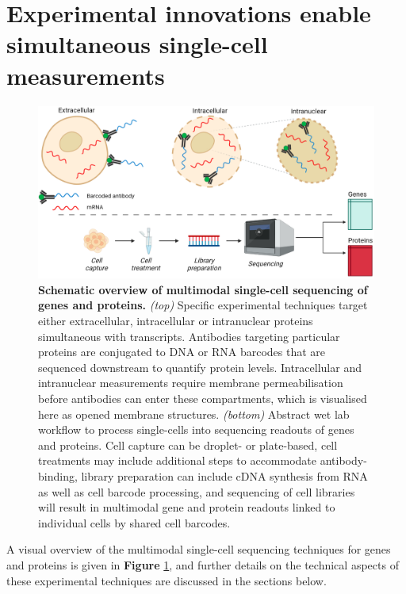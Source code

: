 \documentclass[times, twoside, watermark]{zHenriquesLab-StyleBioRxiv}
\begin{document}
\section*{Experimental innovations enable simultaneous single-cell measurements}

\begin{figure}
\centering
\includegraphics[width=0.8\linewidth]{Figures/LitRev_KR_fig1_v2}
\caption{\textbf{Schematic overview of multimodal single-cell sequencing of genes and proteins.} \textit{(top)} Specific experimental techniques target either extracellular, intracellular or intranuclear proteins simultaneous with transcripts. Antibodies targeting particular proteins are conjugated to DNA or RNA barcodes that are sequenced downstream to quantify protein levels. Intracellular and intranuclear measurements require membrane  permeabilisation before antibodies can enter these compartments, which is visualised here as opened membrane structures. \textit{(bottom)} Abstract wet lab workflow to process single-cells into sequencing readouts of genes and proteins. Cell capture can be droplet- or plate-based, cell treatments may include additional steps to accommodate antibody-binding, library preparation can include cDNA synthesis from RNA as well as cell barcode processing, and sequencing of cell libraries will result in multimodal gene and protein readouts linked to individual cells by shared cell barcodes.}
\label{fig:Figure 1}
\end{figure}

A visual overview of the multimodal single-cell sequencing techniques for genes and proteins is given in \textbf{Figure} \ref{fig:Figure 1}, and further details on the technical aspects of these experimental techniques are discussed in the sections below.
\end{document}
